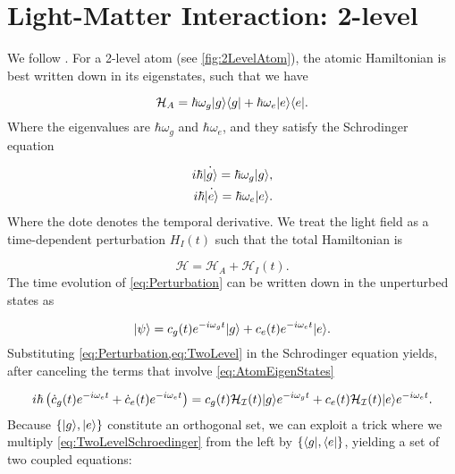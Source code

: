 \chapter{Light-Matter Interaction: 2-level}\label{ch:LightMatter}

We follow \cite{Leeuwen2017}. For a 2-level atom (see \cref{fig:2LevelAtom}), the atomic Hamiltonian is best written down in its eigenstates, such that we have 

\begin{equation}\label{eq:AtomHamiltonian}
	\mathcal{H}_A = \hbar \omega_g \lvert g\rangle\langle g\rvert + \hbar \omega_e \lvert e\rangle\langle e\rvert.
\end{equation}
Where the eigenvalues are $\hbar \omega_g$ and $\hbar \omega_e$, and they satisfy the Schrodinger equation

\begin{subequations}\label{eq:AtomEigenStates}
	\begin{align}
		i \hbar \dot{\lvert g\rangle}= \hbar \omega_g \lvert g\rangle, \\
		i \hbar \dot{\lvert e\rangle}= \hbar \omega_e \lvert e\rangle.
	\end{align}
\end{subequations}
Where the dote denotes the temporal derivative. We treat the light field as a time-dependent perturbation $H_{I}(t)$ such that the total Hamiltonian is

\begin{equation}\label{eq:Perturbation}
	\mathcal{H} = \mathcal{H}_A + \mathcal{H}_{I}(t).
\end{equation}
The time evolution of \cref{eq:Perturbation} can be written down in the unperturbed states as

\begin{equation}\label{eq:TwoLevel}
	\lvert\psi\rangle = c_g(t) e^{-i \omega_g t} \lvert g\rangle + c_e(t) e^{-i \omega_e t} \lvert e\rangle.
\end{equation}
Substituting \cref{eq:Perturbation,eq:TwoLevel} in the Schrodinger equation yields, after canceling the terms that involve \cref{eq:AtomEigenStates} 

\begin{equation}\label{eq:TwoLevelSchroedinger}
	i \hbar \left(\dot{c}_g(t) e^{-i \omega_e t}+\dot{c}_e(t) e^{-i \omega_e t} \right) = c_g(t) \mathcal{H_I}(t)\lvert g\rangle e^{-i \omega_g t} + c_e(t) \mathcal{H_I}(t) \lvert e\rangle e^{-i \omega_e t}.
\end{equation}
Because $\{\lvert g\rangle,\lvert e\rangle\}$ constitute an orthogonal set, we can exploit a trick where we multiply \cref{eq:TwoLevelSchroedinger} from the left by $\{\langle g\rvert,\langle e\rvert\}$, yielding a set of two coupled equations:

